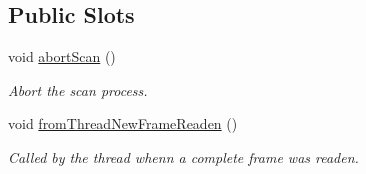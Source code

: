 \subsection*{Public Slots}
\begin{DoxyCompactItemize}
\item 
\hypertarget{classmdt_modbus_tcp_port_manager_ab6cc6b2a57c1c126be0a9c3142a6f0e5}{
void \hyperlink{classmdt_modbus_tcp_port_manager_ab6cc6b2a57c1c126be0a9c3142a6f0e5}{abortScan} ()}
\label{classmdt_modbus_tcp_port_manager_ab6cc6b2a57c1c126be0a9c3142a6f0e5}

\begin{DoxyCompactList}\small\item\em Abort the scan process. \end{DoxyCompactList}\item 
void \hyperlink{classmdt_modbus_tcp_port_manager_ad941ea607f00db54aa6deb2866a539e9}{fromThreadNewFrameReaden} ()
\begin{DoxyCompactList}\small\item\em Called by the thread whenn a complete frame was readen. \end{DoxyCompactList}\end{DoxyCompactItemize}
